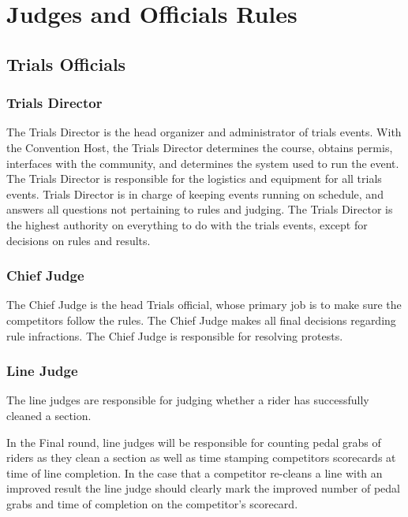 \chapter{Judges and Officials Rules}

\section{Trials Officials}

\subsection{Trials Director}

The Trials Director is the head organizer and administrator of trials events.
With the Convention Host, the Trials Director determines the course, obtains permis, interfaces with the community, and determines the system used to run the event.
The Trials Director is responsible for the logistics and equipment for all trials events.
Trials Director is in charge of keeping events running on schedule, and answers all questions not pertaining to rules and judging.
The Trials Director is the highest authority on everything to do with the trials events, except for decisions on rules and results.

\subsection{Chief Judge}

The Chief Judge is the head Trials official, whose primary job is to make sure the competitors follow the rules.
The Chief Judge makes all final decisions regarding rule infractions.
The Chief Judge is responsible for resolving protests.

\subsection{Line Judge}

The line judges are responsible for judging whether a rider has successfully cleaned a section.

In the Final round, line judges will be responsible for counting pedal grabs of riders as they clean a section as well as time stamping competitors scorecards at time of line completion.
In the case that a competitor re-cleans a line with an improved result the line judge should clearly mark the improved number of pedal grabs and time of completion on the competitor's scorecard.


